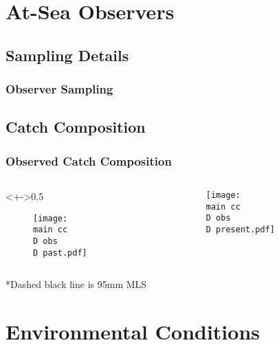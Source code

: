 \documentclass{beamer}
\numberwithin{equation}{section}		%
\numberwithin{figure}{section}	   	%
\numberwithin{table}{section}				%
\newcommand{\D}{.}  %
\newcommand{\main}{C:/bio.data/bio.snowcrab/assessments/2018/presentations/4X/}
\begin{document}
%
\section{At-Sea Observers}
\subsection{Sampling Details}
%
\begin{frame}
\frametitle{Observer Sampling}
\begin{figure}
	
\end{figure}
\end{frame}

%
\subsection{Catch Composition}
%
\begin{frame}
\frametitle{Observed Catch Composition}

\begin{columns}
\begin{column}<+->{0.5\textwidth}
%
\begin{figure}
\centerline{\texttt{[image: \\main cc\\D obs\\D past.pdf]}}
%
\end{figure}
\end{column}
%
\begin{column}{0.5\textwidth}
\begin{figure}
%

\centerline{\texttt{[image: \\main cc\\D obs\\D present.pdf]}}
%
\end{figure}
%
\end{column}
\end{columns}
*Dashed black line is 95mm MLS
%
\end{frame}




\section{Environmental Conditions}
\end{document}
